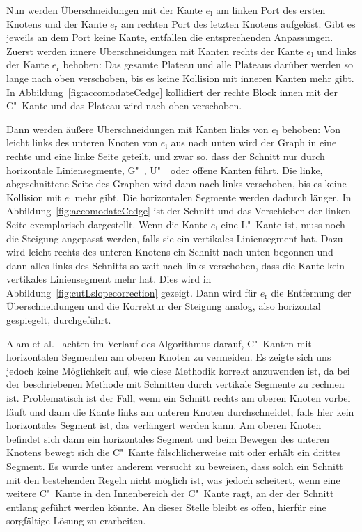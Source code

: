\documentclass[a4paper]{scrreprt}
\theoremstyle{definition}
\begin{document}
Nun werden Überschneidungen mit der Kante $e_\text{l}$ am linken Port des ersten Knotens und der Kante $e_\text{r}$ am rechten Port des letzten Knotens aufgelöst. Gibt es jeweils an dem Port keine Kante, entfallen die entsprechenden Anpassungen. Zuerst werden innere Überschneidungen mit Kanten rechts der Kante $e_\text{l}$  und links der Kante $e_\text{r}$ behoben: Das gesamte Plateau und alle Plateaus darüber werden so lange nach oben verschoben, bis es keine Kollision mit inneren Kanten mehr gibt. In Abbildung~\ref{fig:accomodateCedge} kollidiert der rechte Block innen mit der C"~Kante und das Plateau wird nach oben verschoben.

Dann werden äußere Überschneidungen mit Kanten links von $e_\text{l}$ behoben: Von leicht links des unteren Knoten von  $e_\text{l}$ aus nach unten wird der Graph in eine rechte und eine linke Seite geteilt, und zwar so, dass der Schnitt nur durch horizontale Liniensegmente, G"~, U"~~oder offene Kanten führt. Die linke, abgeschnittene Seite des Graphen wird dann nach links verschoben, bis es keine Kollision mit $e_\text{l}$ mehr gibt. Die horizontalen Segmente werden dadurch länger. In Abbildung~\ref{fig:accomodateCedge} ist der Schnitt und das Verschieben der linken Seite exemplarisch dargestellt. Wenn die Kante $e_\text{l}$ eine L"~Kante ist, muss noch die Steigung angepasst werden, falls sie ein vertikales Liniensegment hat. Dazu wird leicht rechts des unteren Knotens ein Schnitt nach unten begonnen und dann alles links des Schnitts so weit nach links verschoben, dass die Kante kein vertikales Liniensegment mehr hat. Dies wird in Abbildung~\ref{fig:cutLslopecorrection} gezeigt. Dann wird für $e_\text{r}$ die Entfernung der Überschneidungen und die Korrektur der Steigung analog, also horizontal gespiegelt, durchgeführt.

Alam et al.~\cite{smooth-13} achten im Verlauf des Algorithmus darauf, C"~Kanten mit horizontalen Segmenten am oberen Knoten zu vermeiden. Es zeigte sich uns jedoch keine Möglichkeit auf, wie diese Methodik korrekt anzuwenden ist, da bei der beschriebenen Methode mit Schnitten durch vertikale Segmente zu rechnen ist. Problematisch ist der Fall, wenn ein Schnitt rechts am oberen Knoten vorbei läuft und dann die Kante links am unteren Knoten durchschneidet, falls hier kein horizontales Segment ist, das verlängert werden kann. Am oberen Knoten befindet sich dann ein horizontales Segment und beim Bewegen des unteren Knotens bewegt sich die C"~Kante fälschlicherweise mit oder erhält ein drittes Segment. Es wurde unter anderem versucht zu beweisen, dass solch ein Schnitt mit den bestehenden Regeln nicht möglich ist, was jedoch scheitert, wenn eine weitere C"~Kante in den Innenbereich der C"~Kante ragt, an der der Schnitt entlang geführt werden könnte. An dieser Stelle bleibt es offen, hierfür eine sorgfältige Lösung zu erarbeiten.
\end{document}
